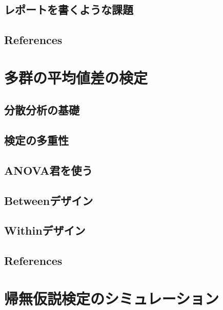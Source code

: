 \documentclass[
  a4paper,
]{ltjsbook}
\begin{document}
\section{レポートを書くような課題}\label{ux30ecux30ddux30fcux30c8ux3092ux66f8ux304fux3088ux3046ux306aux8ab2ux984c}

\section{References}\label{references-1}



\chapter{多群の平均値差の検定}\label{ux591aux7fa4ux306eux5e73ux5747ux5024ux5deeux306eux691cux5b9a}

\section{分散分析の基礎}\label{ux5206ux6563ux5206ux6790ux306eux57faux790e}

\section{検定の多重性}\label{ux691cux5b9aux306eux591aux91cdux6027}

\section{ANOVA君を使う}\label{anovaux541bux3092ux4f7fux3046}

\section{Betweenデザイン}\label{betweenux30c7ux30b6ux30a4ux30f3}

\section{Withinデザイン}\label{withinux30c7ux30b6ux30a4ux30f3}

\section{References}\label{references-2}



\chapter{帰無仮説検定のシミュレーション}\label{ux5e30ux7121ux4eeeux8aacux691cux5b9aux306eux30b7ux30dfux30e5ux30ecux30fcux30b7ux30e7ux30f3}
\end{document}
